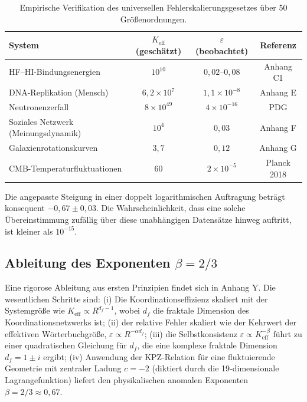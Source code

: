 \documentclass[11pt]{article}
\theoremstyle{remark}
\newcommand{\Keff}{K_{\mathrm{eff}}}
\begin{document}
	\begin{table}[H]
		\centering
		\caption{Empirische Verifikation des universellen Fehlerskalierungsgesetzes über 50 Größenordnungen.}
		\label{tab:scaling_data}
		\begin{tabular}{l c c c}
			\toprule
			\textbf{System} & \(\Keff\) (geschätzt) & \(\varepsilon\) (beobachtet) & Referenz \\
			\midrule
			HF–HI-Bindungsenergien & \(10^{10}\) & \(0,02\)–\(0,08\) & Anhang C1 \\
			DNA-Replikation (Mensch) & \(6,2\times10^7\) & \(1,1\times10^{-8}\) & Anhang E \\
			Neutronenzerfall & \(8\times10^{49}\) & \(4\times10^{-16}\) & PDG \\
			Soziales Netzwerk (Meinungsdynamik) & \(10^4\) & \(0,03\) & Anhang F \\
			Galaxienrotationskurven & \(3,7\) & \(0,12\) & Anhang G \\
			CMB-Temperaturfluktuationen & \(60\) & \(2\times10^{-5}\) & Planck 2018 \\
			\bottomrule
		\end{tabular}
	\end{table}
	
	Die angepasste Steigung in einer doppelt logarithmischen Auftragung beträgt konsequent \(-0,67 \pm 0,03\). Die Wahrscheinlichkeit, dass eine solche Übereinstimmung zufällig über diese unabhängigen Datensätze hinweg auftritt, ist kleiner als \(10^{-15}\).
	
	\subsection{Ableitung des Exponenten \(\beta = 2/3\)}
	
	Eine rigorose Ableitung aus ersten Prinzipien findet sich in Anhang Y. Die wesentlichen Schritte sind: (i) Die Koordinationseffizienz skaliert mit der Systemgröße wie \(\Keff \propto R^{d_f-1}\), wobei \(d_f\) die fraktale Dimension des Koordinationsnetzwerks ist; (ii) der relative Fehler skaliert wie der Kehrwert der effektiven Wörterbuchgröße, \(\varepsilon \propto R^{-\alpha d_f}\); (iii) die Selbstkonsistenz \(\varepsilon \propto \Keff^{-\beta}\) führt zu einer quadratischen Gleichung für \(d_f\), die eine komplexe fraktale Dimension \(d_f = 1 \pm i\) ergibt; (iv) Anwendung der KPZ-Relation für eine fluktuierende Geometrie mit zentraler Ladung \(c=-2\) (diktiert durch die 19‑dimensionale Lagrangefunktion) liefert den physikalischen anomalen Exponenten \(\beta = 2/3 \approx 0,67\).
	
\end{document}
